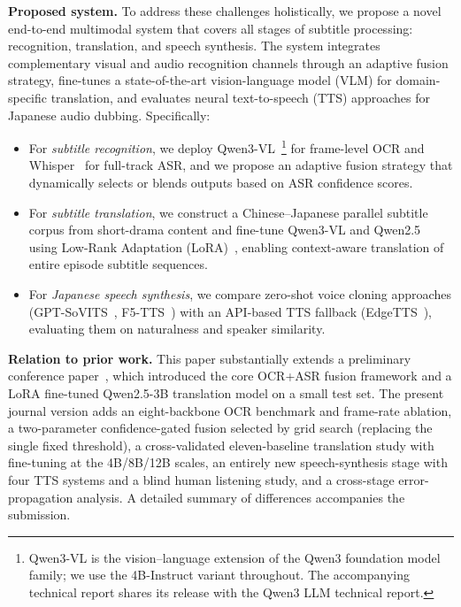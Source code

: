 \documentclass[journal]{IEEEtran}
\begin{document}
\textbf{Proposed system.}
To address these challenges holistically, we propose a novel end-to-end multimodal system that covers all stages of subtitle processing: recognition, translation, and speech synthesis.
The system integrates complementary visual and audio recognition channels through an adaptive fusion strategy, fine-tunes a state-of-the-art vision-language model (VLM) for domain-specific translation, and evaluates neural text-to-speech (TTS) approaches for Japanese audio dubbing.
Specifically:
\begin{itemize}
 \item For \textit{subtitle recognition}, we deploy Qwen3-VL~\cite{qwen3vl2025}\footnote{Qwen3-VL is the vision--language extension of the Qwen3 foundation model family; we use the 4B-Instruct variant throughout. The accompanying technical report shares its release with the Qwen3 LLM technical report.} for frame-level OCR and Whisper~\cite{radford2023robust} for full-track ASR, and we propose an adaptive fusion strategy that dynamically selects or blends outputs based on ASR confidence scores.
 \item For \textit{subtitle translation}, we construct a Chinese--Japanese parallel subtitle corpus from short-drama content and fine-tune Qwen3-VL and Qwen2.5~\cite{yang2024qwen2} using Low-Rank Adaptation (LoRA)~\cite{hu2022lora}, enabling context-aware translation of entire episode subtitle sequences.
 \item For \textit{Japanese speech synthesis}, we compare zero-shot voice cloning approaches (GPT-SoVITS~\cite{gptsovits2024}, F5-TTS~\cite{chen2024f5tts}) with an API-based TTS fallback (EdgeTTS~\cite{edgetts2024}), evaluating them on naturalness and speaker similarity.
\end{itemize}

\textbf{Relation to prior work.}
This paper substantially extends a preliminary conference paper~\cite{an2026icassp}, which introduced the core OCR+ASR fusion framework and a LoRA fine-tuned Qwen2.5-3B translation model on a small test set.
The present journal version adds an eight-backbone OCR benchmark and frame-rate ablation, a two-parameter confidence-gated fusion selected by grid search (replacing the single fixed threshold), a cross-validated eleven-baseline translation study with fine-tuning at the 4B/8B/12B scales, an entirely new speech-synthesis stage with four TTS systems and a blind human listening study, and a cross-stage error-propagation analysis. A detailed summary of differences accompanies the submission.
\end{document}
